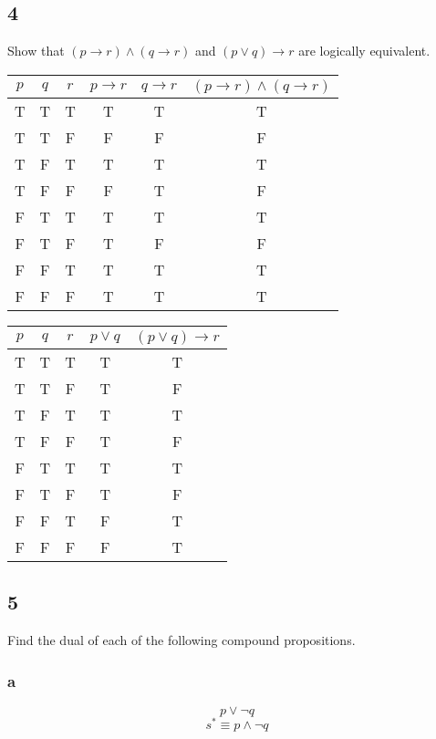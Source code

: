 \documentclass[letterpaper, 12pt]{math}
\begin{document}
\subsection*{4}
Show that \( (p \to r) \wedge (q \to r) \) and \( (p \vee q) \to r \) are
logically equivalent.
\begin{center}
  \begin{tabular}{|c|c|c|c|c|c|}
    \hline
    \( p \) & \( q \) & \( r \) & \( p \to r \) & \( q \to r \) &
    \( (p \to r) \wedge (q \to r) \) \\ \hline
    T & T & T & T & T & T \\ \hline
    T & T & F & F & F & F \\ \hline
    T & F & T & T & T & T \\ \hline
    T & F & F & F & T & F \\ \hline
    F & T & T & T & T & T \\ \hline
    F & T & F & T & F & F \\ \hline
    F & F & T & T & T & T \\ \hline
    F & F & F & T & T & T \\ \hline
  \end{tabular}
\end{center}
\begin{center}
  \begin{tabular}{|c|c|c|c|c|}
    \hline
    \( p \) & \( q \) & \( r \) & \( p \vee q \) & \( (p \vee q) \to r \)
        \\ \hline
    T & T & T & T & T \\ \hline
    T & T & F & T & F \\ \hline
    T & F & T & T & T \\ \hline
    T & F & F & T & F \\ \hline
    F & T & T & T & T \\ \hline
    F & T & F & T & F \\ \hline
    F & F & T & F & T \\ \hline
    F & F & F & F & T \\ \hline
  \end{tabular}
\end{center}

\subsection*{5}
Find the dual of each of the following compound propositions.

\subsubsection*{a}
\[ p \vee \neg{q} \]
\[ s^{*} \equiv p \wedge \neg{q} \]
\end{document}
